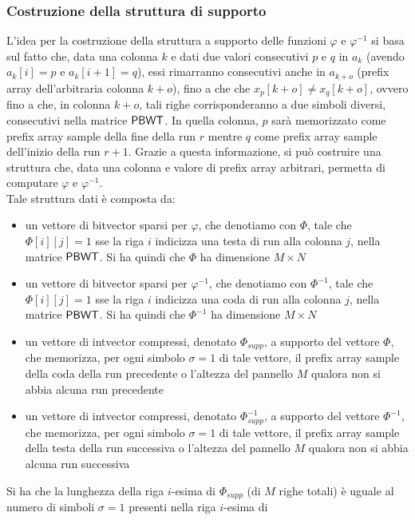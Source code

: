 \subsubsection{Costruzione della struttura di supporto}
L'idea per la costruzione della struttura a supporto delle
funzioni $\varphi$ e $\varphi^{-1}$ si
basa sul fatto che, data una colonna $k$ e dati due valori consecutivi $p$ e $q$
in $a_k$ (avendo $a_k[i]=p$ e $a_k[i+1]=q$), essi rimarranno consecutivi anche
in $a_{k+o}$ (prefix array dell'arbitraria colonna $k+o$), fino a che
che $x_{p}[k+o]\neq x_{q}[k+o]$, ovvero fino a che, in colonna $k+o$, tali righe
corrisponderanno a due simboli diversi, consecutivi nella matrice
$\mbox{\rm {\sf PBWT}}$. In quella colonna, 
$p$ sarà memorizzato come prefix array sample della fine della run $r$
mentre $q$ come prefix array sample dell'inizio della run $r+1$. Grazie
a questa informazione, si può costruire una struttura che, data una colonna
e valore di prefix array arbitrari, permetta di
computare $\varphi$ e $\varphi^{-1}$.\\
Tale struttura dati è composta da:
\begin{itemize}
  \item un vettore di bitvector sparsi per $\varphi$, che denotiamo con
  $\varPhi$, tale che $\varPhi[i][j]=1$ sse la riga $i$ indicizza una testa di
  run alla colonna $j$, nella matrice $\mbox{\rm {\sf PBWT}}$. Si ha quindi che $\varPhi$
  ha dimensione $M\times N$
  \item un vettore di bitvector sparsi per $\varphi^{-1}$, che
  denotiamo con $\varPhi^{-1}$, tale che $\varPhi[i][j]=1$ sse la riga $i$
  indicizza una coda di run alla colonna $j$, nella matrice $\mbox{\rm {\sf PBWT}}$. Si ha
  quindi che $\varPhi^{-1}$ ha dimensione $M\times N$
  \item un vettore di intvector compressi, denotato $\varPhi_{supp}$, a supporto
  del vettore $\varPhi$, che memorizza, per ogni simbolo $\sigma=1$ di tale
  vettore, il 
  prefix array sample della coda della run precedente o l'altezza
  del pannello $M$ qualora non si abbia alcuna run precedente
  \item un vettore di intvector compressi, denotato $\varPhi^{-1}_{supp}$,
  a supporto del vettore $\varPhi^{-1}$, che memorizza, per ogni simbolo
  $\sigma=1$
  di tale vettore,
  il prefix array sample della testa della run successiva o l'altezza
  del pannello $M$ qualora non si abbia alcuna run successiva
\end{itemize}
Si ha che la lunghezza della riga $i$-esima di
$\varPhi_{supp}$ (di $M$ righe totali) è 
uguale al numero di simboli $\sigma=1$ presenti nella riga $i$-esima di

